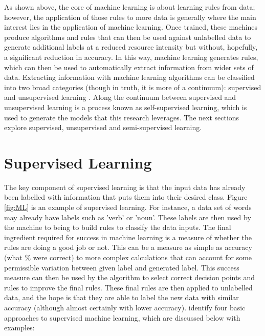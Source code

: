 As shown above, the core of machine learning is about learning rules from data; however, the application of those rules to more data is generally where the main interest lies in the application of machine learning. Once trained, these machines produce algorithms and rules that can then be used against unlabelled data to generate additional labels at a reduced resource intensity but without, hopefully, a significant reduction in accuracy. In this way, machine learning generates rules, which can then be used to automatically extract information from wider sets of data. Extracting information with machine learning algorithms can be classified into two broad categories (though in truth, it is more of a continuum): supervised and unsupervised learning  \parencite{chollet_allaire_2018}. Along the continuum between supervised and unsupervised learning is a process known as self-supervised learning, which is used to generate the models that this research leverages. The next sections explore supervised, unsupervised and semi-supervised learning.

\section{Supervised Learning} The key component of supervised learning is that the input data has already been labelled with information that puts them into their desired class.  Figure \ref{fig:ML} is an example of supervised learning. For instance, a data set of words may already have labels such as ’verb’ or ’noun’. These labels are then used by the machine to being to build rules to classify the data inputs. The final ingredient required for success in machine learning is a measure of whether the rules are doing a good job or not. This can be a measure as simple as accuracy (what \% were correct) to more complex calculations that can account for some permissible variation between given label and generated label. This success measure can then be used by the algorithm to select correct decision points and rules to improve the final rules. These final rules are then applied to unlabelled data, and the hope is that they are able to label the new data with similar accuracy (although almost certainly with lower accuracy). \textcite{chollet_allaire_2018} identify four basic approaches to supervised machine learning, which are discussed below with examples:


